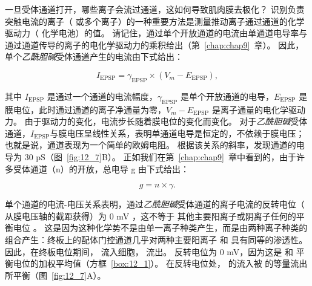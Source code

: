 一旦受体通道打开，哪些离子会流过通道，这如何导致肌肉膜去极化？
识别负责突触电流的离子（ 或多个离子）的一种重要方法是测量推动离子通过通道的化学驱动力（ 化学电池）的值。
请记住，通过单个开放通道的电流由单通道电导率与通过通道传导的离子的电化学驱动力的乘积给出（第~\ref{chap:chap9}~章）。 
因此，单个\textit{乙酰胆碱}受体通道产生的电流由下式给出：


\begin{equation}
	I_{\text{EPSP}} = \gamma_{\text{EPSP}}\times (V_m - E_{\text{EPSP}}),
\end{equation}


其中 $I_{\text{EPSP}}$ 是通过一个通道的电流幅度，$\gamma_{\text{EPSP}}$ 是单个开放通道的电导，$ E_{\text{EPSP}} $ 是膜电位，此时通过通道的离子净通量为零，$V_m - E_{\text{EPSP}}$ 是离子通量的电化学驱动力。
由于驱动力的变化，电流步长随着膜电位的变化而变化。 
对于\textit{乙酰胆碱}受体通道，$I_{\text{EPSP}}$与膜电压呈线性关系，表明单通道电导是恒定的，不依赖于膜电压；
也就是说，通道表现为一个简单的欧姆电阻。
根据该关系的斜率，发现通道的电导为 30 pS（图~\ref{fig:12_7}B）。
正如我们在第~\ref{chap:chap9}~章中看到的，由于许多受体通道（n）的开放，总电导 g 由下式给出：


\begin{equation}
	g = n \times \gamma.
\end{equation}


单个通道的电流-电压关系表明，通过\textit{乙酰胆碱}受体通道的离子电流的反转电位（ 从膜电压轴的截距获得）为 0 mV ，这不等于  其他主要阳离子或阴离子任何的平衡电位 。
这是因为这种化学势不是由单一离子种类产生，而是由两种离子种类的组合产生：终板上的配体门控通道几乎对两种主要阳离子  和  具有同等的渗透性。
因此，在终板电位期间， 流入细胞， 流出。
反转电位为 0 mV，因为这是  和  平衡电位的加权平均值（方框~\ref{box:12_1}）。
在反转电位处， 的流入被  的等量流出所平衡（图~\ref{fig:12_7}A）。


